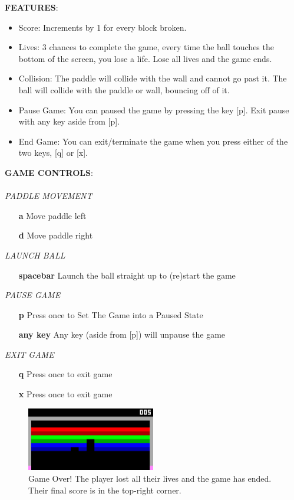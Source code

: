 \documentclass{article}
\begin{document}
\begin{enumerate}
\textbf{FEATURES}:
\begin{itemize}
    \item Score: Increments by 1 for every block broken. 
    \item Lives: 3 chances to complete the game, every time the ball touches the bottom of the screen, you lose a life. Lose all lives and the game ends.
    \item Collision: The paddle will collide with the wall and cannot go past it. The ball will collide with the paddle or wall, bouncing off of it.
    \item Pause Game: You can paused the game by pressing the key [p]. Exit pause with any key aside from [p].
    \item End Game: You can exit/terminate the game when you press either of the two keys, [q] or [x]. \\ 
\end{itemize}

\textbf{GAME CONTROLS}: \\ \\
    \textit{PADDLE MOVEMENT} 
    \begin{itemize}
        \item [\textbf{a}] Move paddle left
        \item [\textbf{d}] Move paddle right \\
    \end{itemize}

     \textit{LAUNCH BALL}
    \begin{itemize}
        \item [\textbf{spacebar}] Launch the ball straight up to (re)start the game \\
    \end{itemize}
    
    \textit{PAUSE GAME}
    \begin{itemize}
        \item [\textbf{p}] Press once to Set The Game into a Paused State
        \item [\textbf{any key}] Any key (aside from [p]) will unpause the game  \\
    \end{itemize}
    
    \textit{EXIT GAME}
    \begin{itemize}
        \item [\textbf{q}] Press once to exit game
        \item [\textbf{x}] Press once to exit game \\
    \end{itemize}
    
\begin{figure}[ht!]
    \centering
    \includegraphics[width=0.5\textwidth]{gameplay2.png}
    \caption{Game Over! The player lost all their lives and the game has ended. Their final score is in the top-right corner.}
    \label{f: Gameplay 2}
\end{figure}

\end{enumerate}
\end{document}
